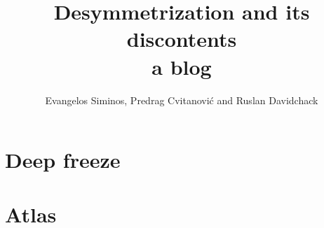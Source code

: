 \documentclass[10pt,openany]{book}
\title{Desymmetrization and its discontents
       \\ \Huge a blog}
\author{Evangelos Siminos,
        Predrag Cvitanovi\'{c} and
        Ruslan Davidchack}
\begin{document}
\maketitle

\tableofcontents






\chapter{Deep freeze}
\label{c-freeze}


    \newpage







% 


    \chapter{Atlas}
    \label{chap:atlas}







% 
% 

\end{document}
